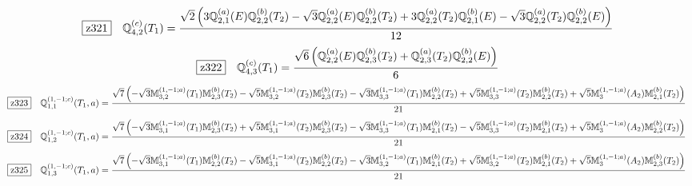 \documentclass[fleqn,10pt,landscape]{jsarticle}
\begin{document}
\begin{dmath*}
\hspace*{3mm}\fbox{z321}\quad \mathbb{Q}_{4,2}^{(c)}(T_{1})=\frac{\sqrt{2} \left(3 \mathbb{Q}_{2,1}^{(a)}(E) \mathbb{Q}_{2,2}^{(b)}(T_{2}) - \sqrt{3} \mathbb{Q}_{2,2}^{(a)}(E) \mathbb{Q}_{2,2}^{(b)}(T_{2}) + 3 \mathbb{Q}_{2,2}^{(a)}(T_{2}) \mathbb{Q}_{2,1}^{(b)}(E) - \sqrt{3} \mathbb{Q}_{2,2}^{(a)}(T_{2}) \mathbb{Q}_{2,2}^{(b)}(E)\right)}{12}
\end{dmath*}
\begin{dmath*}
\hspace*{3mm}\fbox{z322}\quad \mathbb{Q}_{4,3}^{(c)}(T_{1})=\frac{\sqrt{6} \left(\mathbb{Q}_{2,2}^{(a)}(E) \mathbb{Q}_{2,3}^{(b)}(T_{2}) + \mathbb{Q}_{2,3}^{(a)}(T_{2}) \mathbb{Q}_{2,2}^{(b)}(E)\right)}{6}
\end{dmath*}
\begin{dmath*}
\hspace*{3mm}\fbox{z323}\quad \mathbb{Q}_{1,1}^{(1,-1;c)}(T_{1},a)=\frac{\sqrt{7} \left(- \sqrt{3} \mathbb{M}_{3,2}^{(1,-1;a)}(T_{1}) \mathbb{M}_{2,3}^{(b)}(T_{2}) - \sqrt{5} \mathbb{M}_{3,2}^{(1,-1;a)}(T_{2}) \mathbb{M}_{2,3}^{(b)}(T_{2}) - \sqrt{3} \mathbb{M}_{3,3}^{(1,-1;a)}(T_{1}) \mathbb{M}_{2,2}^{(b)}(T_{2}) + \sqrt{5} \mathbb{M}_{3,3}^{(1,-1;a)}(T_{2}) \mathbb{M}_{2,2}^{(b)}(T_{2}) + \sqrt{5} \mathbb{M}_{3}^{(1,-1;a)}(A_{2}) \mathbb{M}_{2,1}^{(b)}(T_{2})\right)}{21}
\end{dmath*}
\begin{dmath*}
\hspace*{3mm}\fbox{z324}\quad \mathbb{Q}_{1,2}^{(1,-1;c)}(T_{1},a)=\frac{\sqrt{7} \left(- \sqrt{3} \mathbb{M}_{3,1}^{(1,-1;a)}(T_{1}) \mathbb{M}_{2,3}^{(b)}(T_{2}) + \sqrt{5} \mathbb{M}_{3,1}^{(1,-1;a)}(T_{2}) \mathbb{M}_{2,3}^{(b)}(T_{2}) - \sqrt{3} \mathbb{M}_{3,3}^{(1,-1;a)}(T_{1}) \mathbb{M}_{2,1}^{(b)}(T_{2}) - \sqrt{5} \mathbb{M}_{3,3}^{(1,-1;a)}(T_{2}) \mathbb{M}_{2,1}^{(b)}(T_{2}) + \sqrt{5} \mathbb{M}_{3}^{(1,-1;a)}(A_{2}) \mathbb{M}_{2,2}^{(b)}(T_{2})\right)}{21}
\end{dmath*}
\begin{dmath*}
\hspace*{3mm}\fbox{z325}\quad \mathbb{Q}_{1,3}^{(1,-1;c)}(T_{1},a)=\frac{\sqrt{7} \left(- \sqrt{3} \mathbb{M}_{3,1}^{(1,-1;a)}(T_{1}) \mathbb{M}_{2,2}^{(b)}(T_{2}) - \sqrt{5} \mathbb{M}_{3,1}^{(1,-1;a)}(T_{2}) \mathbb{M}_{2,2}^{(b)}(T_{2}) - \sqrt{3} \mathbb{M}_{3,2}^{(1,-1;a)}(T_{1}) \mathbb{M}_{2,1}^{(b)}(T_{2}) + \sqrt{5} \mathbb{M}_{3,2}^{(1,-1;a)}(T_{2}) \mathbb{M}_{2,1}^{(b)}(T_{2}) + \sqrt{5} \mathbb{M}_{3}^{(1,-1;a)}(A_{2}) \mathbb{M}_{2,3}^{(b)}(T_{2})\right)}{21}
\end{dmath*}
\end{document}

